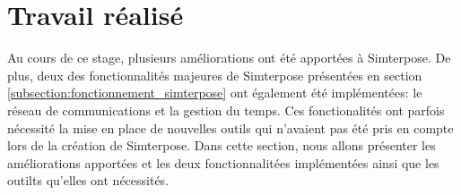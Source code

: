 \section{Travail réalisé}
\label{section:work}
Au cours de ce stage, plusieurs améliorations ont été apportées à Simterpose. De plus, deux des fonctionnalités majeures de Simterpose présentées en section \ref{subsection:fonctionnement_simterpose} ont également été implémentées: le réseau de communications et la gestion du temps. Ces fonctionalités ont parfois nécessité la mise en place de nouvelles outils qui n'avaient pas été pris en compte lors de la création de Simterpose. Dans cette section, nous allons présenter les améliorations apportées et les deux fonctionnalitées implémentées ainsi que les outilts qu'elles ont nécessités.



